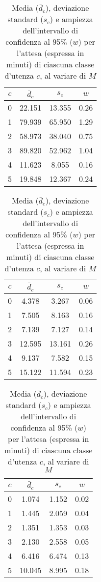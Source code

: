 \begin{table}[ht]
\centering
\begin{subtable}{0.5\textwidth}
\centering
{\tablecolors
\begin{tabular}{|c|c|c|c|}
\hline
$c$ & $\bar{d}_c$ & $s_c$ & $w$\\
\hline
0 & 22.151 & 13.355 & 0.26 \\
\hline
1 & 79.939 & 65.950 & 1.29 \\
\hline
2 & 58.973 & 38.040 & 0.75 \\
\hline
3 & 89.820 & 52.962 & 1.04 \\
\hline
4 & 11.623 & 8.055 & 0.16 \\
\hline
5 & 19.848 & 12.367 & 0.24 \\
\hline
\end{tabular}}
\caption{$M = 2$}
\end{subtable}%
\begin{subtable}{0.5\textwidth}
\centering
{\tablecolors
\begin{tabular}{|c|c|c|c|}
\hline
$c$ & $\bar{d}_c$ & $s_c$ & $w$\\
\hline
0 & 4.378 & 3.267 & 0.06 \\
\hline
1 & 7.505 & 8.163 & 0.16 \\
\hline
2 & 7.139 & 7.127 & 0.14 \\
\hline
3 & 12.595 & 13.161 & 0.26 \\
\hline
4 & 9.137 & 7.582 & 0.15 \\
\hline
5 & 15.122 & 11.594 & 0.23 \\
\hline
\end{tabular}}
\caption{$M = 3$}
\end{subtable}
\begin{subtable}{0.5\textwidth}
\centering
{\tablecolors
\begin{tabular}{|c|c|c|c|}
\hline
$c$ & $\bar{d}_c$ & $s_c$ & $w$\\
\hline
0 & 1.074 & 1.152 & 0.02 \\
\hline
1 & 1.445 & 2.059 & 0.04 \\
\hline
2 & 1.351 & 1.353 & 0.03 \\
\hline
3 & 2.130 & 2.558 & 0.05 \\
\hline
4 & 6.416 & 6.474 & 0.13 \\
\hline
5 & 10.045 & 8.995 & 0.18 \\
\hline
\end{tabular}}
\caption{$M = 4$}
\end{subtable}
\caption{Media ($\bar{d}_c$), deviazione standard ($s_c$) e ampiezza dell'intervallo di confidenza al 95\% ($w$) per l'attesa (espressa in minuti) di ciascuna classe d'utenza $c$, al variare di $M$}
\label{table:miglioria-esperimenti-simulazione-1}
\end{table}

